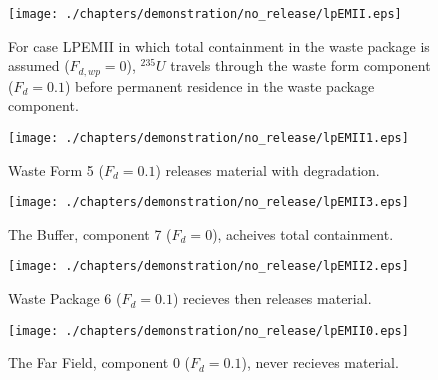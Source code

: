 \begin{figure}[ht]
\centering
\texttt{[image: ./chapters/demonstration/no\_release/lpEMII.eps]}
\caption[$^{235}U$ residence. Lumped Parameter  Waste Package No Release.]{
For case LPEMII in which total containment in the waste package is assumed 
($F_{d,wp}=0$), $^{235}U$ travels through the waste form component ($F_d = 0.1$) before 
permanent residence in the waste package component.
}
\label{fig:lpEMIIall}
\begin{minipage}[b]{0.45\linewidth}

  \texttt{[image: ./chapters/demonstration/no\_release/lpEMII1.eps]}
  \caption[LPEMII Waste Form Contaminants.]{
    Waste Form 5 ($F_d = 0.1$) releases material with degradation. 
    }
  \label{fig:lpEMIIwf5}
  
  \texttt{[image: ./chapters/demonstration/no\_release/lpEMII3.eps]}
  \caption[Case LPEMII Buffer Contaminants]{
    The Buffer, component 7 ($F_d=0$), acheives total containment.
    }
  \label{fig:lpEMIIbuff}

\end{minipage}
\hspace{0.05\linewidth}
\begin{minipage}[b]{0.45\linewidth}
  \texttt{[image: ./chapters/demonstration/no\_release/lpEMII2.eps]}
  \caption[Case LPEMII Waste Package Contaminants.]{ 
    Waste Package 6 ($F_d = 0.1$) recieves then releases material. 
    }
  \label{fig:lpEMIIwp6}

  \texttt{[image: ./chapters/demonstration/no\_release/lpEMII0.eps]}
  \caption[Case LPEMII Waste Package Contaminants.]{ 
    The Far Field, component 0 ($F_d = 0.1$), never recieves material.
    }
  \label{fig:lpEMIIff0}


  \end{minipage}
\end{figure}
%
